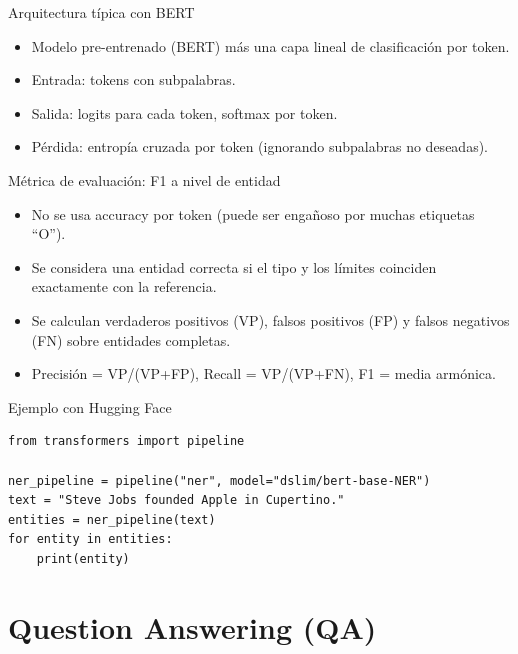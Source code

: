 \documentclass[aspectratio=169, 10pt, xcolor=table]{beamer}
\begin{document}
\begin{frame}{Arquitectura típica con BERT}
    \begin{itemize}
        \item Modelo pre-entrenado (BERT) más una capa lineal de clasificación por token.
        \item Entrada: tokens con subpalabras.
        \item Salida: logits para cada token, softmax por token.
        \item Pérdida: entropía cruzada por token (ignorando subpalabras no deseadas).
    \end{itemize}
\end{frame}

\begin{frame}{Métrica de evaluación: F1 a nivel de entidad}
    \begin{itemize}
        \item No se usa accuracy por token (puede ser engañoso por muchas etiquetas ``O'').
        \item Se considera una entidad correcta si el tipo y los límites coinciden exactamente con la referencia.
        \item Se calculan verdaderos positivos (VP), falsos positivos (FP) y falsos negativos (FN) sobre entidades completas.
        \item Precisión = VP/(VP+FP), Recall = VP/(VP+FN), F1 = media armónica.
    \end{itemize}
\end{frame}

\begin{frame}[fragile]{Ejemplo con Hugging Face}
    \begin{lstlisting}
from transformers import pipeline

ner_pipeline = pipeline("ner", model="dslim/bert-base-NER")
text = "Steve Jobs founded Apple in Cupertino."
entities = ner_pipeline(text)
for entity in entities:
    print(entity)
    \end{lstlisting}
\end{frame}

\section{Question Answering (QA)}
\end{document}
